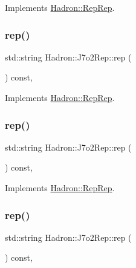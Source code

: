 Implements \mbox{\hyperlink{structHadron_1_1RepRep_ab3213025f6de249f7095892109575fde}{Hadron\+::\+Rep\+Rep}}.

\mbox{\label{structHadron_1_1J7o2Rep_a7fe87890d8fa36768f1a09f929f26b9c}} 
\subsubsection{\texorpdfstring{rep()}{rep()}\hspace{0.1cm}{\footnotesize\ttfamily [2/5]}}
{\footnotesize\ttfamily std\+::string Hadron\+::\+J7o2\+Rep\+::rep (\begin{DoxyParamCaption}{ }\end{DoxyParamCaption}) const\hspace{0.3cm}{\ttfamily [inline]}, {\ttfamily [virtual]}}



Implements \mbox{\hyperlink{structHadron_1_1RepRep_ab3213025f6de249f7095892109575fde}{Hadron\+::\+Rep\+Rep}}.

\mbox{\label{structHadron_1_1J7o2Rep_a7fe87890d8fa36768f1a09f929f26b9c}} 
\subsubsection{\texorpdfstring{rep()}{rep()}\hspace{0.1cm}{\footnotesize\ttfamily [3/5]}}
{\footnotesize\ttfamily std\+::string Hadron\+::\+J7o2\+Rep\+::rep (\begin{DoxyParamCaption}{ }\end{DoxyParamCaption}) const\hspace{0.3cm}{\ttfamily [inline]}, {\ttfamily [virtual]}}



Implements \mbox{\hyperlink{structHadron_1_1RepRep_ab3213025f6de249f7095892109575fde}{Hadron\+::\+Rep\+Rep}}.

\mbox{\label{structHadron_1_1J7o2Rep_a7fe87890d8fa36768f1a09f929f26b9c}} 
\subsubsection{\texorpdfstring{rep()}{rep()}\hspace{0.1cm}{\footnotesize\ttfamily [4/5]}}
{\footnotesize\ttfamily std\+::string Hadron\+::\+J7o2\+Rep\+::rep (\begin{DoxyParamCaption}{ }\end{DoxyParamCaption}) const\hspace{0.3cm}{\ttfamily [inline]}, {\ttfamily [virtual]}}



